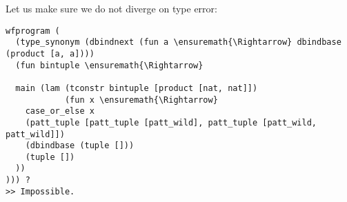 Let us make sure we do not diverge on type error:

\begin{verbatim}
wfprogram (
  (type_synonym (dbindnext (fun a \ensuremath{\Rightarrow} dbindbase (product [a, a])))
  (fun bintuple \ensuremath{\Rightarrow} 
  
  main (lam (tconstr bintuple [product [nat, nat]])
            (fun x \ensuremath{\Rightarrow} 
    case_or_else x
    (patt_tuple [patt_tuple [patt_wild], patt_tuple [patt_wild, patt_wild]])
    (dbindbase (tuple []))
    (tuple [])
  ))
))) ?
>> Impossible.
\end{verbatim}
